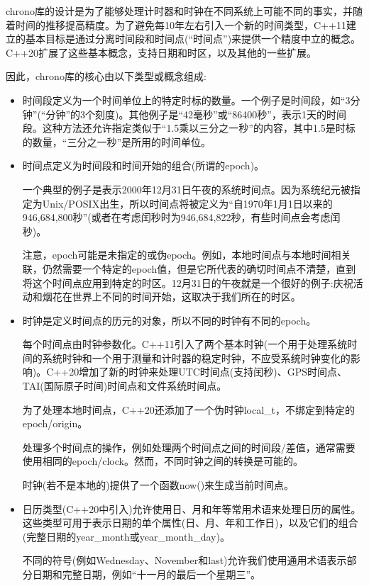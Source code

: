 chrono库的设计是为了能够处理计时器和时钟在不同系统上可能不同的事实，并随着时间的推移提高精度。为了避免每10年左右引入一个新的时间类型，C++11建立的基本目标是通过分离时间段和时间点(“时间点”)来提供一个精度中立的概念。C++20扩展了这些基本概念，支持日期和时区，以及其他的一些扩展。

因此，chrono库的核心由以下类型或概念组成:

\begin{itemize}
\item 
时间段定义为一个时间单位上的特定时标的数量。一个例子是时间段，如“3分钟”(“分钟”的3个刻度)。其他例子是“42毫秒”或“86400秒”，表示1天的时间段。这种方法还允许指定类似于“1.5乘以三分之一秒”的内容，其中1.5是时标的数量，“三分之一秒”是所用的时间单位。

\item
时间点定义为时间段和时间开始的组合(所谓的epoch)。

一个典型的例子是表示2000年12月31日午夜的系统时间点。因为系统纪元被指定为Unix/POSIX出生，所以时间点将被定义为“自1970年1月1日以来的946,684,800秒”(或者在考虑闰秒时为946,684,822秒，有些时间点会考虑闰秒)。

注意，epoch可能是未指定的或伪epoch。例如，本地时间点与本地时间相关联，仍然需要一个特定的epoch值，但是它所代表的确切时间点不清楚，直到将这个时间点应用到特定的时区。12月31日的午夜就是一个很好的例子:庆祝活动和烟花在世界上不同的时间开始，这取决于我们所在的时区。

\item
时钟是定义时间点的历元的对象，所以不同的时钟有不同的epoch。

每个时间点由时钟参数化。C++11引入了两个基本时钟(一个用于处理系统时间的系统时钟和一个用于测量和计时器的稳定时钟，不应受系统时钟变化的影响)。C++20增加了新的时钟来处理UTC时间点(支持闰秒)、GPS时间点、TAI(国际原子时间)时间点和文件系统时间点。

为了处理本地时间点，C++20还添加了一个伪时钟local\_t，不绑定到特定的epoch/origin。

处理多个时间点的操作，例如处理两个时间点之间的时间段/差值，通常需要使用相同的epoch/clock。然而，不同时钟之间的转换是可能的。

时钟(若不是本地的)提供了一个函数now()来生成当前时间点。

\item
日历类型(C++20中引入)允许使用日、月和年等常用术语来处理日历的属性。这些类型可用于表示日期的单个属性(日、月、年和工作日)，以及它们的组合(完整日期的year\_month或year\_month\_day)。

不同的符号(例如Wednesday、November和last)允许我们使用通用术语表示部分日期和完整日期，例如“十一月的最后一个星期三”。


\end{itemize}
